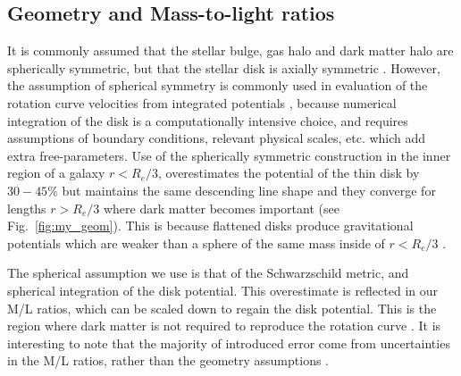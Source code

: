 \documentclass[reprint,%
 amsmath,amssymb,
 aps,
]{revtex4-1}
\begin{document}
 

 


 








 
\subsection{  Geometry  and  Mass-to-light ratios}

 
  
    It is commonly assumed that   the stellar bulge, gas halo and   dark matter halo are spherically symmetric, but that the stellar disk is axially symmetric \cite{1954AJ.....59..273S}. 
    However, the assumption of spherical symmetry is commonly used   in evaluation of the   rotation curve velocities from integrated potentials \cite{2022A&A...664A..40M,PhysRevD.70.083509}, because numerical integration of the disk is a computationally intensive choice, and requires assumptions of  boundary conditions,   relevant physical scales,  etc. which add extra free-parameters\cite{2011A&A...531A..36H}.
Use of the spherically symmetric construction in the inner region of a galaxy $r< R_e/3$,  overestimates the potential of the thin disk by $30-45\%$ but maintains the same descending line shape and they converge for lengths $r>R_e/3$ where dark matter becomes important (see Fig.~\ref{fig:my_geom}).   This is   because flattened disks produce gravitational potentials which are weaker than a sphere of the same mass inside of $r< R_e/3$ \cite{Chatterjee}.


The spherical assumption we use is that of the 
 Schwarzschild metric, and spherical integration of the disk potential.   This overestimate  is reflected in our M/L ratios,   which can be scaled down to regain the disk potential.   This is the region where dark matter is not required to reproduce the rotation curve \cite{1985ApJAlbada}.   It is interesting to note that     the majority of introduced  error come from uncertainties in the M/L ratios, rather than the geometry assumptions \cite{2016Lelli}. 
 
\end{document}
